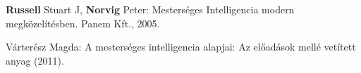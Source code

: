 \begin{thebibliography}{9}
\textbf{Russell} Stuart J, \textbf{Norvig} Peter:
Mesterséges Intelligencia modern megközelítésben.
Panem Kft., 2005.

Várterész Magda:
A mesterséges intelligencia alapjai: Az előadások mellé vetített anyag
(2011).
\end{thebibliography}
